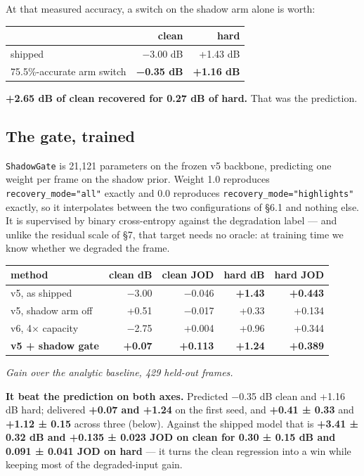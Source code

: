At that measured accuracy, a switch on the shadow arm alone is worth:

\begin{longtable}[]{@{}lrr@{}}
\toprule
& clean & hard\tabularnewline
\midrule
\endhead
shipped & −3.00 dB & +1.43 dB\tabularnewline
75.5\%-accurate arm switch & \textbf{−0.35 dB} & \textbf{+1.16 dB}\tabularnewline
\bottomrule
\end{longtable}

\textbf{+2.65 dB of clean recovered for 0.27 dB of hard.} That was the prediction.

\hypertarget{the-gate-trained}{%
\subsection{The gate, trained}\label{the-gate-trained}}

\texttt{ShadowGate} is 21,121 parameters on the frozen v5 backbone, predicting one
weight per frame on the shadow prior. Weight 1.0 reproduces \texttt{recovery\_mode="all"}
exactly and 0.0 reproduces \texttt{recovery\_mode="highlights"} exactly, so it
interpolates between the two configurations of §6.1 and nothing else. It is
supervised by binary cross-entropy against the degradation label --- and unlike
the residual scale of §7, that target needs no oracle: at training time we know
whether we degraded the frame.

\begin{longtable}[]{@{}lrrrr@{}}
\toprule
method & clean dB & clean JOD & hard dB & hard JOD\tabularnewline
\midrule
\endhead
v5, as shipped & −3.00 & −0.046 & \textbf{+1.43} & \textbf{+0.443}\tabularnewline
v5, shadow arm off & +0.51 & −0.017 & +0.33 & +0.134\tabularnewline
v6, 4× capacity & −2.75 & +0.004 & +0.96 & +0.344\tabularnewline
\textbf{v5 + shadow gate} & \textbf{+0.07} & \textbf{+0.113} & \textbf{+1.24} & \textbf{+0.389}\tabularnewline
\bottomrule
\end{longtable}

\emph{Gain over the analytic baseline, 429 held-out frames.}

\textbf{It beat the prediction on both axes.} Predicted −0.35 dB clean and +1.16 dB
hard; delivered \textbf{+0.07 and +1.24} on the first seed, and \textbf{+0.41 ± 0.33} and
\textbf{+1.12 ± 0.15} across three (below). Against the shipped model that is
\textbf{+3.41 ± 0.32 dB and +0.135 ± 0.023 JOD on clean for 0.30 ± 0.15 dB and
0.091 ± 0.041 JOD on hard} --- it turns the clean regression into a win while
keeping most of the degraded-input gain.

